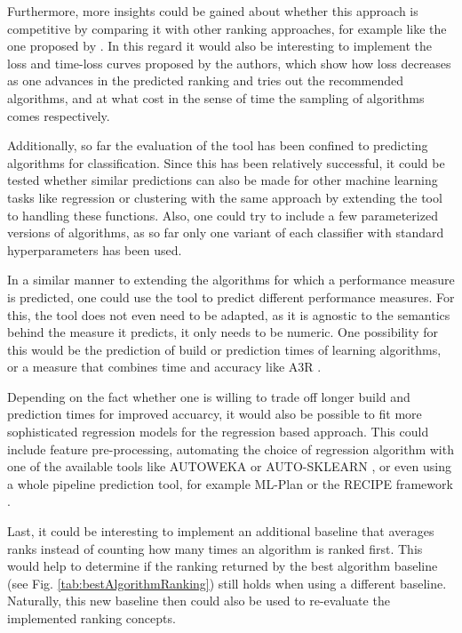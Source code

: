 Furthermore, more insights could be gained about whether this approach is competitive by comparing it with other ranking approaches, for example like the one proposed by \citeauthor{DBLP:journals/ml/AbdulrahmanBRV18} \cite{DBLP:journals/ml/AbdulrahmanBRV18}. In this regard it would also be interesting to implement the loss and time-loss curves proposed by the authors, which show how loss decreases as one advances in the predicted ranking and tries out the recommended algorithms, and at what cost in the sense of time the sampling of algorithms comes respectively.

Additionally, so far the evaluation of the tool has been confined to predicting algorithms for classification. Since this has been relatively successful, it could be tested whether similar predictions can also be made for other machine learning tasks like regression or clustering with the same approach by extending the tool to handling these functions. Also, one could try to include a few parameterized versions of algorithms, as so far only one variant of each classifier with standard hyperparameters has been used. 

In a similar manner to extending the algorithms for which a performance measure is predicted, one could use the tool to predict different performance measures. For this, the tool does not even need to be adapted, as it is agnostic to the semantics behind the measure it predicts, it only needs to be numeric. One possibility for this would be the prediction of build or prediction times of learning algorithms, or a measure that combines time and accuracy like A3R \cite{DBLP:journals/ml/AbdulrahmanBRV18}.

Depending on the fact whether one is willing to trade off longer build and prediction times for improved accuarcy, it would also be possible to fit more sophisticated regression models for the regression based approach. This could include feature pre-processing, automating the choice of regression algorithm with one of the available tools like AUTOWEKA \cite{thornton2013auto} or AUTO-SKLEARN \cite{feurer2015efficient}, or even using a whole pipeline prediction tool, for example ML-Plan \cite{wever2017automatic} or the RECIPE framework \cite{DBLP:conf/eurogp/SaPOP17}. 

Last, it could be interesting to implement an additional baseline that averages ranks instead of counting how many times an algorithm is ranked first. This would help to determine if the ranking returned by the best algorithm baseline (see Fig. \ref{tab:bestAlgorithmRanking}) still holds when using a different baseline. Naturally, this new baseline then could also be used to re-evaluate the implemented ranking concepts. 


